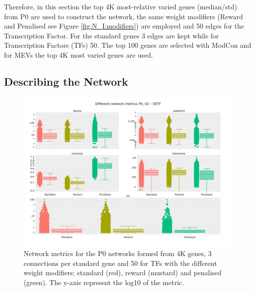 Therefore, in this section the top 4K most-relative varied genes (median/std) from P0 are used to construct the network, the same weight modifiers (Reward and Penalised see Figure \ref{fig:N_I:modifiers}) are employed and 50 edges for the Transcription Factor. For the standard genes 3 edges are kept while for Transcription Factors (TFs) 50. The top 100 genes are selected with ModCon and for MEVs the top 4K most varied genes are used.

\subsection{Describing the Network}


\begin{figure}[!htb]    
    \centering
    \includegraphics[width=1.0\textwidth,height=0.7\textheight,keepaspectratio]{Sections/Network_I/Resources/P0/P0_NetworkMetricsComp_50TF_2.png}
    \caption{Network metrics for the P0 networks formed from 4K genes, 3 connections per standard gene and 50 for TFs with the different weight modifiers; standard (red), reward (mustard) and penalised (green). The y-axis represent the log10 of the metric. }
    \label{fig:N_I:net_metrics_p0}
\end{figure}

